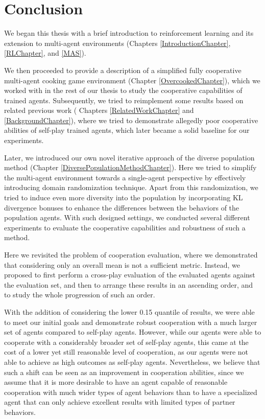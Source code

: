 \chapter*{Conclusion}

We began this thesis with a brief introduction to reinforcement learning and its extension to multi-agent environments (Chapters \ref{IntroductionChapter}, \ref{RLChapter}, and \ref{MAS}).

We then proceeded to provide a description of a simplified fully cooperative multi-agent cooking game environment (Chapter \ref{OvercookedChapter}), which we worked with in the rest of our thesis to study the cooperative capabilities of trained agents. 
Subsequently, we tried to reimplement some results based on related previous work ( Chapters \ref{RelatedWorkChapter} and \ref{BackgroundChapter}), where we tried to demonstrate allegedly poor cooperative abilities of self-play trained agents, which later became a solid baseline for our experiments.

Later, we introduced our own novel iterative approach of the diverse population method (Chapter \ref{DiversePopulationMethodChapter}).
Here we tried to simplify the multi-agent environment towards a single-agent perspective by effectively introducing domain randomization technique.
Apart from this randomization, we tried to induce even more diversity into the population by incorporating KL divergence bonuses to enhance the differences between the behaviors of the population agents.
With such designed settings, we conducted several different experiments to evaluate the cooperative capabilities and robustness of such a method.

Here we revisited the problem of cooperation evaluation, where we demonstrated that considering only an overall mean is not a sufficient metric.
Instead, we proposed to first perform a cross-play evaluation of the evaluated agents against the evaluation set, and then to arrange these results in an ascending order, and to study the whole progression of such an order.

With the addition of considering the lower 0.15 quantile of results, we were able to meet our initial goals and demonstrate robust cooperation with a much larger set of agents compared to self-play agents.
However, while our agents were able to cooperate with a considerably broader set of self-play agents, this came at the cost of a lower yet still reasonable level of cooperation, as our agents were not able to achieve as high outcomes as self-play agents.
Nevertheless, we believe that such a shift can be seen as an improvement in cooperation abilities, since we assume that it is more desirable to have an agent capable of reasonable cooperation with much wider types of agent behaviors than to have a specialized agent that can only achieve excellent results with limited types of partner behaviors.


